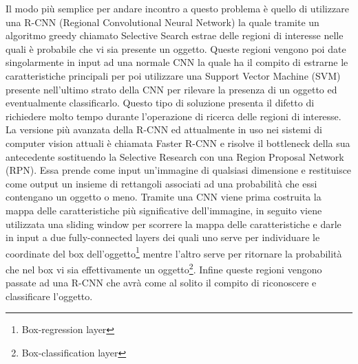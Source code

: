 Il modo più semplice per andare incontro a questo problema è quello di utilizzare una R-CNN (Regional Convolutional Neural Network) la quale tramite un algoritmo greedy chiamato Selective Search estrae delle regioni di interesse nelle quali è probabile che vi sia presente un oggetto. Queste regioni vengono poi date singolarmente in input ad una normale CNN la quale ha il compito di estrarne le caratteristiche principali per poi utilizzare una Support Vector Machine (SVM) presente nell'ultimo strato della CNN per rilevare la presenza di un oggetto ed eventualmente classificarlo. Questo tipo di soluzione presenta il difetto di richiedere molto tempo durante l'operazione di ricerca delle regioni di interesse.\\
La versione più avanzata della R-CNN ed attualmente in uso nei sistemi di computer vision attuali è chiamata Faster R-CNN e risolve il bottleneck della sua antecedente sostituendo la Selective Research con una Region Proposal Network (RPN). Essa prende come input un'immagine di qualsiasi dimensione e restituisce come output un insieme di rettangoli associati ad una probabilità che essi contengano un oggetto o meno. Tramite una CNN viene prima costruita la mappa delle caratteristiche più significative dell'immagine, in seguito viene utilizzata una sliding window per scorrere la mappa delle caratteristiche e darle in input a due fully-connected layers dei quali uno serve per individuare le coordinate del box dell'oggetto\footnote{Box-regression layer} mentre l'altro serve per ritornare la probabilità che nel box vi sia effettivamente un oggetto\footnote{Box-classification layer}. Infine queste regioni vengono passate ad una R-CNN che avrà come al solito il compito di riconoscere e classificare l'oggetto.

